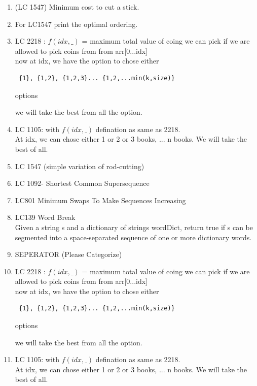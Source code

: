 \begin{exercise}
    \begin{enumerate}
    \item (LC 1547) Minimum cost to cut a stick.
    \item  For LC1547 print the optimal ordering.
    \item 
    LC 2218 : $f(idx,\_)$ = maximum total value of coing we can pick if we are allowed to pick coins from from arr[0...idx]\\
    now at idx, we have the option to chose either \begin{verbatim} {1}, {1,2}, {1,2,3}... {1,2,...min(k,size)} \end{verbatim} options
       
    we will take the best from all the option.
   
    \item LC 1105: with $f(idx,\_)$ defination as same as 2218.\\
    At idx, we can chose either 1 or 2 or 3 books, ... n books. We will take the best of all.

    \item LC 1547 (simple variation of rod-cutting)
    \item LC 1092- Shortest Common Supersequence
    \item LC801 Minimum Swaps To Make Sequences Increasing 
    \item LC139 Word Break\\ Given a string s and a dictionary of strings wordDict, return true if s can be segmented into a space-separated sequence of one or more dictionary words.
    \item SEPERATOR (Please Categorize)
    \item 
    LC 2218 : $f(idx,\_)$ = maximum total value of coing we can pick if we are allowed to pick coins from from arr[0...idx]\\
    now at idx, we have the option to chose either \begin{verbatim} {1}, {1,2}, {1,2,3}... {1,2,...min(k,size)} \end{verbatim} options
       
    we will take the best from all the option.
   
    \item LC 1105: with $f(idx,\_)$ defination as same as 2218.\\
    At idx, we can chose either 1 or 2 or 3 books, ... n books. We will take the best of all.


\end{enumerate}
\end{exercise}
